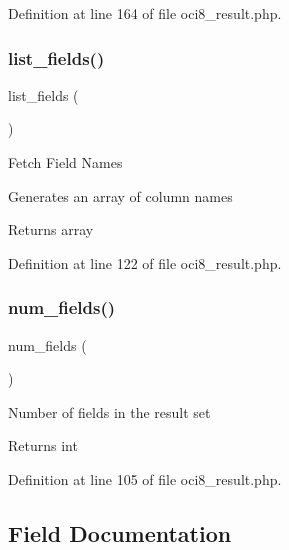 Definition at line 164 of file oci8\+\_\+result.\+php.

\mbox{\label{class_c_i___d_b__oci8__result_a50b54eb4ea7cfd039740f532988ea776}} 
\subsubsection{\texorpdfstring{list\_fields()}{list\_fields()}}
{\footnotesize\ttfamily list\+\_\+fields (\begin{DoxyParamCaption}{ }\end{DoxyParamCaption})}

Fetch Field Names

Generates an array of column names

\begin{DoxyReturn}{Returns}
array 
\end{DoxyReturn}


Definition at line 122 of file oci8\+\_\+result.\+php.

\mbox{\label{class_c_i___d_b__oci8__result_af831bf363e4d7d661a717a4932af449d}} 
\subsubsection{\texorpdfstring{num\_fields()}{num\_fields()}}
{\footnotesize\ttfamily num\+\_\+fields (\begin{DoxyParamCaption}{ }\end{DoxyParamCaption})}

Number of fields in the result set

\begin{DoxyReturn}{Returns}
int 
\end{DoxyReturn}


Definition at line 105 of file oci8\+\_\+result.\+php.



\subsection{Field Documentation}
\mbox{\label{class_c_i___d_b__oci8__result_a9b3b7163763603c5a0bcdfd819ae074d}} 
